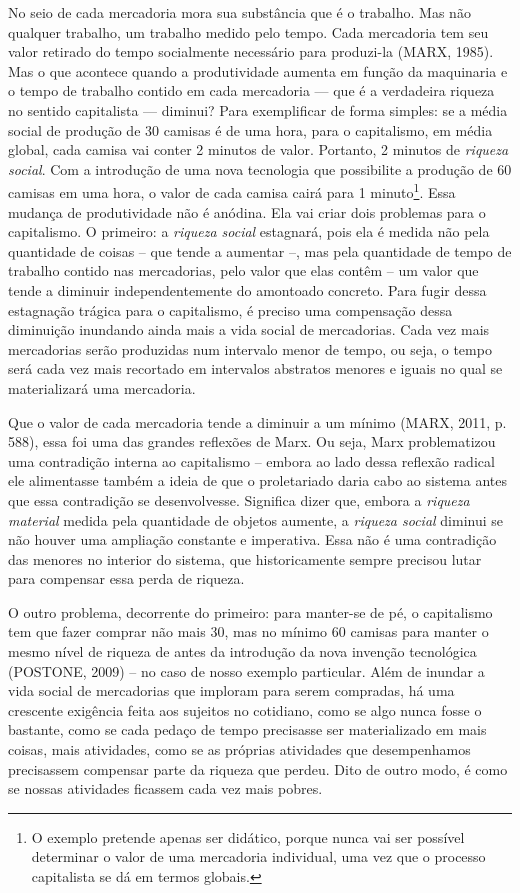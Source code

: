 No seio de cada mercadoria mora sua substância que é o trabalho. Mas não
qualquer trabalho, um trabalho medido pelo tempo. Cada mercadoria tem
seu valor retirado do tempo socialmente necessário para produzi-la
(MARX, 1985). Mas o que acontece quando a produtividade aumenta em
função da maquinaria e o tempo de trabalho contido em cada mercadoria
--- que é a verdadeira riqueza no sentido capitalista --- diminui? Para
exemplificar de forma simples: se a média social de produção de 30
camisas é de uma hora, para o capitalismo, em média global, cada camisa
vai conter 2 minutos de valor. Portanto, 2 minutos de \emph{riqueza
social}. Com a introdução de uma nova tecnologia que possibilite a
produção de 60 camisas em uma hora, o valor de cada camisa cairá para 1
minuto\footnote{O exemplo pretende apenas ser didático, porque nunca vai
  ser possível determinar o valor de uma mercadoria individual, uma vez
  que o processo capitalista se dá em termos globais.}. Essa mudança de
produtividade não é anódina. Ela vai criar dois problemas para o
capitalismo. O primeiro: a \emph{riqueza social} estagnará, pois ela é
medida não pela quantidade de coisas -- que tende a aumentar --, mas
pela quantidade de tempo de trabalho contido nas mercadorias, pelo valor
que elas contêm -- um valor que tende a diminuir independentemente do
amontoado concreto. Para fugir dessa estagnação trágica para o
capitalismo, é preciso uma compensação dessa diminuição inundando ainda
mais a vida social de mercadorias. Cada vez mais mercadorias serão
produzidas num intervalo menor de tempo, ou seja, o tempo será cada vez
mais recortado em intervalos abstratos menores e iguais no qual se
materializará uma mercadoria.

Que o valor de cada mercadoria tende a diminuir a um mínimo (MARX, 2011,
p. 588), essa foi uma das grandes reflexões de Marx. Ou seja, Marx
problematizou uma contradição interna ao capitalismo -- embora ao lado
dessa reflexão radical ele alimentasse também a ideia de que o
proletariado daria cabo ao sistema antes que essa contradição se
desenvolvesse. Significa dizer que, embora a \emph{riqueza material}
medida pela quantidade de objetos aumente, a \emph{riqueza social}
diminui se não houver uma ampliação constante e imperativa. Essa não é
uma contradição das menores no interior do sistema, que historicamente
sempre precisou lutar para compensar essa perda de riqueza.

O outro problema, decorrente do primeiro: para manter-se de pé, o
capitalismo tem que fazer comprar não mais 30, mas no mínimo 60 camisas
para manter o mesmo nível de riqueza de antes da introdução da nova
invenção tecnológica (POSTONE, 2009) -- no caso de nosso exemplo
particular. Além de inundar a vida social de mercadorias que imploram
para serem compradas, há uma crescente exigência feita aos sujeitos no
cotidiano, como se algo nunca fosse o bastante, como se cada pedaço de
tempo precisasse ser materializado em mais coisas, mais atividades, como
se as próprias atividades que desempenhamos precisassem compensar parte
da riqueza que perdeu. Dito de outro modo, é como se nossas atividades
ficassem cada vez mais pobres.

